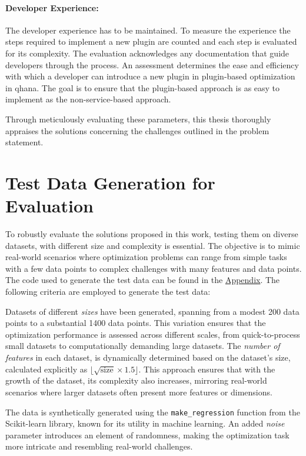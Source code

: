 \documentclass[
  a4paper,  %
  twoside,  %
  bibliography=totoc,
  headsepline,
  cleardoublepage=empty,
  parskip=half,
  draft=false
]{scrbook}
\begin{document}
\paragraph{Developer Experience:}
The developer experience has to be maintained.
To measure the experience the steps required to implement a new plugin are counted and each step is evaluated for its complexity.
The evaluation acknowledges any documentation that guide developers through the process.
An assessment determines the ease and efficiency with which a developer can introduce a new plugin in plugin-based optimization in \gls{qhana}.
The goal is to ensure that the plugin-based approach is as easy to implement as the non-service-based approach.

Through meticulously evaluating these parameters, this thesis thoroughly appraises the solutions concerning the challenges outlined in the problem statement.

\section{Test Data Generation for Evaluation}
To robustly evaluate the solutions proposed in this work, testing them on diverse datasets, with different size and complexity is essential.
The objective is to mimic real-world scenarios where optimization problems can range from simple tasks with a few data points to complex challenges with many features and data points.
The code used to generate the test data can be found in the \hyperref[chap:appendix]{Appendix}.
The following criteria are employed to generate the test data:

Datasets of different \emph{sizes} have been generated, spanning from a modest 200 data points to a substantial 1400 data points.
This variation ensures that the optimization performance is assessed across different scales, from quick-to-process small datasets to computationally demanding large datasets.
The \emph{number of features} in each dataset, is dynamically determined based on the dataset's size, calculated explicitly as \(\lfloor \sqrt{\text{size}} \times 1.5 \rfloor\).
This approach ensures that with the growth of the dataset, its complexity also increases, mirroring real-world scenarios where larger datasets often present more features or dimensions.

The data is synthetically generated using the \texttt{make\_regression} function from the Scikit-learn library, known for its utility in machine learning.
An added \emph{noise} parameter introduces an element of randomness, making the optimization task more intricate and resembling real-world challenges.
\end{document}
